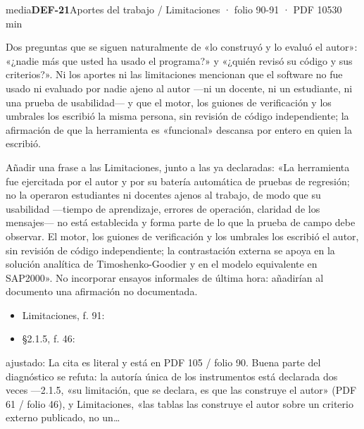 \begin{ficha}{media}{\casilla\textbf{DEF-21}\quad{}\quad Aportes del trabajo /\allowbreak{} Limitaciones · folio 90-91 · PDF 105\hfill 30 min}
\par
{}Dos preguntas que se siguen naturalmente de «lo construyó y lo evaluó el autor»: «¿nadie más que usted ha usado el programa?» y «¿quién revisó su código y sus criterios?». Ni los aportes ni las limitaciones mencionan que el software no fue usado ni evaluado por nadie ajeno al autor —ni un docente, ni un estudiante, ni una prueba de usabilidad— y que el motor, los guiones de verificación y los umbrales los escribió la misma persona, sin revisión de código independiente; la afirmación de que la herramienta es «funcional» descansa por entero en quien la escribió.\par
{}Añadir una frase a las Limitaciones, junto a las ya declaradas: «La herramienta fue ejercitada por el autor y por su batería automática de pruebas de regresión; no la operaron estudiantes ni docentes ajenos al trabajo, de modo que su usabilidad —tiempo de aprendizaje, errores de operación, claridad de los mensajes— no está establecida y forma parte de lo que la prueba de campo debe observar. El motor, los guiones de verificación y los umbrales los escribió el autor, sin revisión de código independiente; la contrastación externa se apoya en la solución analítica de Timoshenko-Goodier y en el modelo equivalente en SAP2000». No incorporar ensayos informales de última hora: añadirían al documento una afirmación no documentada.\par
{}\begin{itemize}[leftmargin=1.2em,itemsep=1pt,topsep=1pt]
\item {\small Limitaciones, f. 91: }
\item {\small §2.1.5, f. 46: }
\end{itemize}
{\footnotesize\color{gris}ajustado: La cita es literal y está en PDF 105 /\allowbreak{} folio 90. Buena parte del diagnóstico se refuta: la autoría única de los instrumentos está declarada dos veces —2.1.5, «su limitación, que se declara, es que las construye el autor» (PDF 61 /\allowbreak{} folio 46), y Limitaciones, «las tablas las construye el autor sobre un criterio externo publicado, no un…\par}
\end{ficha}
